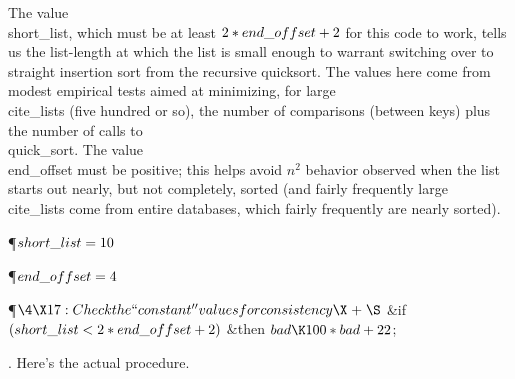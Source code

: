 The value \\{short\_list}, which must be at least $2\ast\\{end\_offset}+2$ for
this code to work, tells us the list-length at which the list is small
enough to warrant switching over to straight insertion sort from the
recursive quicksort.  The values here come from modest empirical tests
aimed at minimizing, for large \\{cite\_list}s (five hundred or so), the
number of comparisons (between keys) plus the number of calls to
\\{quick\_sort}.  The value \\{end\_offset} must be positive; this helps
avoid $n^2$ behavior observed when the list starts out nearly, but not
completely, sorted (and fairly frequently large \\{cite\_list}s come from
entire databases, which fairly frequently are nearly sorted).

\Y\P\D {}$\\{short\_list}=10$\par
\P\D {}$\\{end\_offset}=4$\par
\Y\P$\4\X17:Check the ``constant'' values for consistency\X\mathrel{+}\S$\6
\&{if} $(\\{short\_list}<2\ast\\{end\_offset}+2)$ \1\&{then}\5
$\\{bad}\K100\ast\\{bad}+22$;\2\par
\fi

.
Here's the actual procedure.

